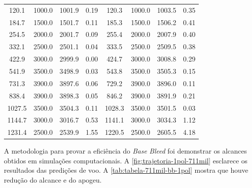 \begin{table}[ht]
{\begin{tabular}{c|c|c|c|c|c|c|c}
    \num{120,1} &
      \num{1000,0} &
      \num{1001,9} &
      \num{0,19} &
      \num{120,3} &
      \num{1000,0} &
      \num{1003,5} &
      \num{0,35} \\
    \num{184,7} &
      \num{1500,0} &
      \num{1501,7} &
      \num{0,11} &
      \num{185,3} &
      \num{1500,0} &
      \num{1506,2} &
      \num{0,41} \\
    \num{254,5} &
      \num{2000,0} &
      \num{2001,7} &
      \num{0,09} &
      \num{255,4} &
      \num{2000,0} &
      \num{2007,9} &
      \num{0,40} \\
    \num{332,1} &
      \num{2500,0} &
      \num{2501,1} &
      \num{0,04} &
      \num{333,5} &
      \num{2500,0} &
      \num{2509,5} &
      \num{0,38} \\
    \num{422,9} &
      \num{3000,0} &
      \num{2999,9} &
      \num{0,00} &
      \num{424,7} &
      \num{3000,0} &
      \num{3008,8} &
      \num{0,29} \\
    \num{541,9} &
      \num{3500,0} &
      \num{3498,9} &
      \num{0,03} &
      \num{543,8} &
      \num{3500,0} &
      \num{3505,3} &
      \num{0,15} \\
    \num{731,3} &
      \num{3900,0} &
      \num{3897,6} &
      \num{0,06} &
      \num{729,2} &
      \num{3900,0} &
      \num{3896,0} &
      \num{0,11} \\
    \num{838,4} &
      \num{3900,0} &
      \num{3898,3} &
      \num{0,05} &
      \num{846,2} &
      \num{3900,0} &
      \num{3891,9} &
      \num{0,21} \\
    \num{1027,5} &
      \num{3500,0} &
      \num{3504,3} &
      \num{0,11} &
      \num{1028,3} &
      \num{3500,0} &
      \num{3501,5} &
      \num{0,03} \\
    \num{1144,7} &
      \num{3000,0} &
      \num{3016,7} &
      \num{0,53} &
      \num{1141,1} &
      \num{3000,0} &
      \num{3034,3} &
      \num{1,12} \\
    \num{1231,4} &
      \num{2500,0} &
      \num{2539,9} &
      \num{1,55} &
      \num{1220,5} &
      \num{2500,0} &
      \num{2605,5} &
      \num{4,18} \\ \hline
    \end{tabular}%
    }
    \label{tab:tabela-validacao-PRODAS-e-tabela-de-tiro-M107}
\end{table}

A metodologia para provar a eficiência do \textit{Base Bleed} foi demonstrar os alcances obtidos em simulações computacionais. A \autoref{fig:trajetoria-1pol-711mil} esclarece os resultados das predições de voo. A \autoref{tab:tabela-711mil-bb-1pol} mostra que houve redução do alcance e do apogeu.

